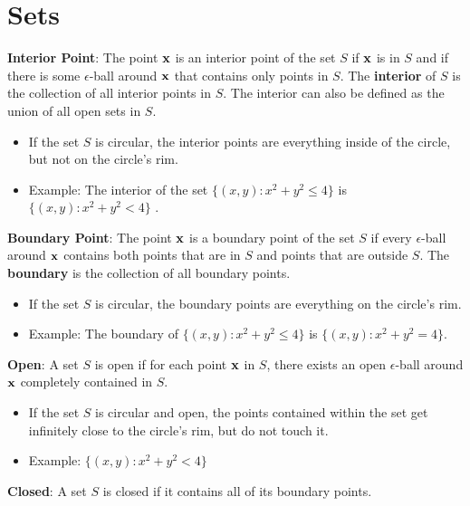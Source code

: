 \documentclass[]{book}
\providecommand{\tightlist}{%
  \setlength{\itemsep}{0pt}\setlength{\parskip}{0pt}}
\theoremstyle{definition}
\theoremstyle{definition}
\theoremstyle{definition}
\theoremstyle{remark}
\begin{document}
\section{Sets}\label{sets}

\textbf{Interior Point}: The point \(\bf x\) is an interior point of the
set \(S\) if \(\bf x\) is in \(S\) and if there is some
\(\epsilon\)-ball around \(\bf x\) that contains only points in \(S\).
The \textbf{interior} of \(S\) is the collection of all interior points
in \(S\). The interior can also be defined as the union of all open sets
in \(S\).

\begin{itemize}
\tightlist
\item
  If the set \(S\) is circular, the interior points are everything
  inside of the circle, but not on the circle's rim.
\item
  Example: The interior of the set \(\{ (x,y) : x^2+y^2\le 4 \}\) is
  \(\{ (x,y) : x^2+y^2< 4 \}\) .
\end{itemize}

\textbf{Boundary Point}: The point \(\bf x\) is a boundary point of the
set \(S\) if every \(\epsilon\)-ball around \(\bf x\) contains both
points that are in \(S\) and points that are outside \(S\). The
\textbf{boundary} is the collection of all boundary points.

\begin{itemize}
\tightlist
\item
  If the set \(S\) is circular, the boundary points are everything on
  the circle's rim.
\item
  Example: The boundary of \(\{ (x,y) : x^2+y^2\le 4 \}\) is
  \(\{ (x,y) : x^2+y^2 = 4 \}\).
\end{itemize}

\textbf{Open}: A set \(S\) is open if for each point \(\bf x\) in \(S\),
there exists an open \(\epsilon\)-ball around \(\bf x\) completely
contained in \(S\).

\begin{itemize}
\tightlist
\item
  If the set \(S\) is circular and open, the points contained within the
  set get infinitely close to the circle's rim, but do not touch it.
\item
  Example: \(\{ (x,y) : x^2+y^2<4 \}\)
\end{itemize}

\textbf{Closed}: A set \(S\) is closed if it contains all of its
boundary points.
\end{document}
